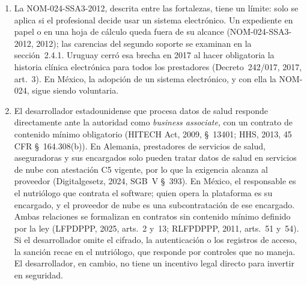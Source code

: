 \documentclass[12pt, a4paper]{article}
\begin{document}
\begin{enumerate}[label=\Roman*.]
  \item La NOM-024-SSA3-2012, descrita entre las fortalezas, tiene
  un límite: solo se aplica si el profesional decide usar un sistema
  electrónico. Un expediente en papel o en una hoja de cálculo
  queda fuera de su alcance (NOM-024-SSA3-2012, 2012); las carencias
  del segundo soporte se examinan en la sección~2.4.1.
  Uruguay cerró esa brecha en 2017 al hacer obligatoria la historia
  clínica electrónica para todos los prestadores (Decreto~242/017,
  2017, art.~3). En México, la adopción de un sistema electrónico,
  y con ella la NOM-024, sigue siendo voluntaria.
 
 
  \item El desarrollador estadounidense que procesa datos de salud
  responde directamente ante la autoridad como \textit{business
  associate}, con un contrato de contenido mínimo obligatorio
  (HITECH Act, 2009, \S~13401; HHS, 2013, 45 CFR \S~164.308(b)).
  En Alemania, prestadores de servicios de salud, aseguradoras y sus
  encargados solo pueden tratar datos de salud en servicios de nube con
  atestación C5 vigente, por lo que la exigencia alcanza al proveedor
  (Digitalgesetz, 2024, SGB~V \S~393). En México, el responsable es el
  nutriólogo que contrata el software; quien opera la plataforma es su
  encargado, y el proveedor de nube es una subcontratación de ese
  encargado. Ambas relaciones se formalizan en contratos sin contenido
  mínimo definido por la ley (LFPDPPP, 2025, arts.~2 y~13; RLFPDPPP, 2011,
  arts.~51 y~54). Si el desarrollador omite el cifrado, la autenticación o
  los registros de acceso, la sanción recae en el nutriólogo, que responde
  por controles que no maneja. El desarrollador, en cambio, no tiene un
  incentivo legal directo para invertir en seguridad.
 

\end{enumerate}
\end{document}
